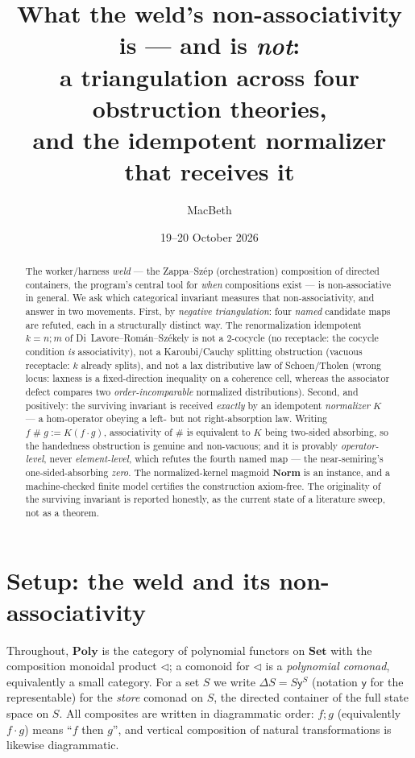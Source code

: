 \documentclass[11pt]{amsart}
\title[What the weld's non-associativity is, and is not]
{What the weld's non-associativity is --- and is \emph{not}:\\
a triangulation across four obstruction theories,\\
and the idempotent normalizer that receives it}
\author{MacBeth}
\date{19--20 October 2026}
\theoremstyle{plain}
\theoremstyle{definition}
\theoremstyle{remark}
\newcommand{\Poly}{\mathbf{Poly}}
\newcommand{\Set}{\mathbf{Set}}
\newcommand{\Norm}{\mathbf{Norm}}
\renewcommand{\lhd}{\triangleleft}
\newcommand{\Store}[1]{\Delta #1}
\newcommand{\comp}{\mathbin{;}}
\newcommand{\sh}{\mathbin{\#}}
\newcommand{\yon}{\mathsf{y}}
\begin{document}
\begin{abstract}
The worker/harness \emph{weld} --- the Zappa--Sz\'ep (orchestration) composition of directed
containers, the program's central tool for \emph{when} compositions exist --- is non-associative in
general. We ask which categorical invariant measures that non-associativity, and answer in two
movements. First, by \emph{negative triangulation}: four \emph{named} candidate maps are refuted,
each in a structurally distinct way. The renormalization idempotent $k=n\comp m$ of
Di~Lavore--Rom\'an--Sz\'ekely is not a $2$-cocycle (no receptacle: the cocycle condition \emph{is}
associativity), not a Karoubi/Cauchy splitting obstruction (vacuous receptacle: $k$ already splits),
and not a lax distributive law of Schoen/Tholen (wrong locus: laxness is a fixed-direction inequality
on a coherence cell, whereas the associator defect compares two \emph{order-incomparable} normalized
distributions). Second, and positively: the surviving invariant is received \emph{exactly} by an
idempotent \emph{normalizer} $K$ --- a hom-operator obeying a left- but not right-absorption law.
Writing $f\sh g:=K(f\cdot g)$, associativity of $\sh$ is equivalent to $K$ being two-sided absorbing,
so the handedness obstruction is genuine and non-vacuous; and it is provably \emph{operator-level},
never \emph{element-level}, which refutes the fourth named map --- the near-semiring's
one-sided-absorbing \emph{zero}. The normalized-kernel magmoid $\Norm$ is an instance, and a
machine-checked finite model certifies the construction axiom-free. The originality of the surviving
invariant is reported honestly, as the current state of a literature sweep, not as a theorem.
\end{abstract}

\maketitle


\section{Setup: the weld and its non-associativity}

Throughout, $\Poly$ is the category of polynomial functors on $\Set$ with the composition monoidal
product $\lhd$; a comonoid for $\lhd$ is a \emph{polynomial comonad}, equivalently a small category.
For a set $S$ we write $\Store{S}=S\yon{}^{S}$ (notation $\yon{}$ for the representable) for the
\emph{store} comonad on $S$, the directed container of the full state space on $S$. All composites
are written in diagrammatic order: $f\comp g$ (equivalently $f\cdot g$) means ``$f$ then $g$'', and
vertical composition of natural transformations is likewise diagrammatic.
\end{document}
